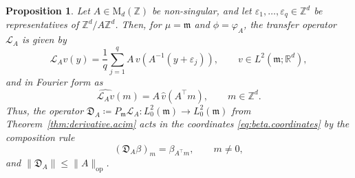 \documentclass[11pt,reqno]{amsart}
\theoremstyle{plain}
\newtheorem{prp}[thm]{Proposition}
\theoremstyle{definition}
\newcommand{\Z}{\mathbb{Z}}
\newcommand{\R}{\mathbb{R}}
\newcommand{\Leb}{\mathfrak{m}}
\newcommand{\D}{\mathfrak{D}}
\newcommand{\Transf}{\mathcal{L}}
\begin{document}
\begin{prp}\label{prp:transfer.torus}
    Let \( A\in \mathrm{M}_d(\Z) \) be non-singular, and let \( \varepsilon_1,\dots,\varepsilon_{q}\in\Z^d \) be representatives of \( \Z^d/A\Z^d \).
    Then, for \( \mu=\Leb \) and \( \phi= \varphi_A  \), the transfer operator \( \Transf_A \) is given by \begin{equation}\label{eq:transfer.explicit}
        \Transf_A v(y)=\frac{1}{q}\sum_{j=1}^{q}A\,v\left(A^{-1}(y+\varepsilon_j)\right),
        \qquad v\in L^2(\Leb;\R^d),
    \end{equation}
    and in Fourier form as    
    \begin{equation}\label{eq:transfer.fourier}
        \widehat{\Transf_A v}(m)=A\,\hat v(A^{\top}m),\qquad m\in\Z^d.
    \end{equation}
    Thus, the operator \( \D_A\coloneqq P_\Leb\Transf_A :L^2_0(\Leb)\to L^2_0(\Leb) \) from Theorem~\ref{thm:derivative.acim} acts in the coordinates \eqref{eq:beta.coordinates} by the composition rule \begin{equation}\label{eq:derivative.beta}
        (\D_A\beta)_m=\beta_{A^{\top}m},\qquad m\neq0,
    \end{equation}
    and \( \lVert \D_A \rVert\le\lVert A \rVert_{\mathrm{op}} \).
\end{prp}
\end{document}
